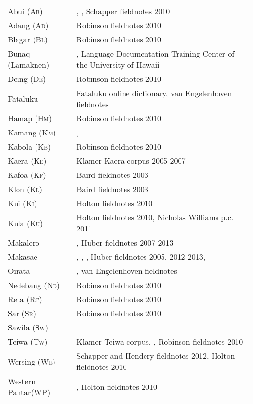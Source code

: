 \documentclass[output=paper]{LSP/langsci}
\begin{document}
\begin{tabular}{p{3.7cm}p{8cm} } 
Abui (\textsc{Ab})&\citet{Kratochvil2007}, \citet{KratochvilEtAl2008}, Schapper fieldnotes 2010\\
Adang (\textsc{Ad})&Robinson fieldnotes 2010\\
Blagar (\textsc{Bl})&Robinson fieldnotes 2010\\
Bunaq (Lamaknen)&\citet{Schappernda}, \citet{Schapper2010} Language Documentation Training Center of the University of Hawaii\footnotemark{}\\
Deing (\textsc{De})&Robinson fieldnotes 2010\\
Fataluku&Fataluku online dictionary\footnotemark{}, van Engelenhoven fieldnotes\\
Hamap (H\textsc{m})&Robinson fieldnotes 2010\\
Kamang (\textsc{Km})&\citet{Schapperndb},\citet{SchapperEtAl2011kamang}\\
Kabola (\textsc{Kb})&Robinson fieldnotes 2010\\
Kaera (\textsc{Ke})&Klamer Kaera corpus 2005-2007\\
Kafoa (\textsc{Kf})&Baird fieldnotes 2003\\
Klon (\textsc{Kl})&Baird fieldnotes 2003\\
Kui (\textsc{Ki})&Holton fieldnotes 2010\\
Kula (\textsc{Ku})&Holton fieldnotes 2010, Nicholas Williams p.c. 2011\\
Makalero&\citet{Huber2011}, Huber fieldnotes 2007-2013\\
Makasae&\citet{Brotherson2003}, \citet{Carr2004}, \citet{Huber2008}, Huber fieldnotes 2005, 2012-2013, \\
Oirata&\citet{DeJong1937}, van Engelenhoven fieldnotes\\
Nedebang (\textsc{Nd})&Robinson fieldnotes 2010\\
Reta (\textsc{Rt})& Robinson fieldnotes 2010\\
Sar (\textsc{Sr})&Robinson fieldnotes 2010\\
Sawila (\textsc{Sw})&\citet{Kratochvilnd}\\
Teiwa (\textsc{Tw})&Klamer Teiwa corpus, \citet{KlamerEtAl2011}, Robinson fieldnotes 2010\\
Wersing (\textsc{We})&Schapper and Hendery fieldnotes 2012, Holton fieldnotes 2010\\
Western Pantar\newline (WP)&\citet{HoltonEtAl2008}, Holton fieldnotes 2010\\ 
\end{tabular}
\end{document}
